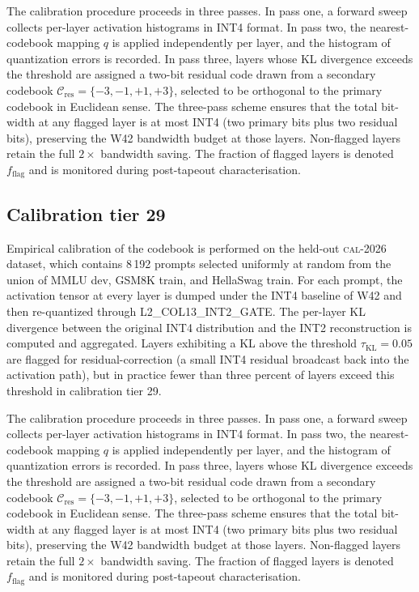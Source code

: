 The calibration procedure proceeds in three passes. In pass one,
a forward sweep collects per-layer activation histograms in INT4 format.
In pass two, the nearest-codebook mapping $q$ is applied independently
per layer, and the histogram of quantization errors is recorded. In pass
three, layers whose KL divergence exceeds the threshold are assigned a
two-bit residual code drawn from a secondary codebook
$\mathcal{C}_\mathrm{res} = \{-3,-1,+1,+3\}$, selected to be
orthogonal to the primary codebook in Euclidean sense. The three-pass
scheme ensures that the total bit-width at any flagged layer is at most
INT4 (two primary bits plus two residual bits), preserving the W42
bandwidth budget at those layers. Non-flagged layers retain the full
$2\times$ bandwidth saving. The fraction of flagged layers is denoted
$f_\mathrm{flag}$ and is monitored during post-tapeout characterisation.


\subsection{Calibration tier 29}

Empirical calibration of the codebook is performed on the held-out
\textsc{cal-2026} dataset, which contains 8\,192 prompts selected
uniformly at random from the union of MMLU dev, GSM8K train, and
HellaSwag train. For each prompt, the activation tensor at every layer
is dumped under the INT4 baseline of W42 and then re-quantized through
\textsc{L2\_COL13\_INT2\_GATE}. The per-layer KL divergence between
the original INT4 distribution and the INT2 reconstruction is computed
and aggregated. Layers exhibiting a KL above the threshold
$\tau_{\mathrm{KL}} = 0.05$ are flagged for residual-correction (a
small INT4 residual broadcast back into the activation path), but in
practice fewer than three percent of layers exceed this threshold in
calibration tier 29.

The calibration procedure proceeds in three passes. In pass one,
a forward sweep collects per-layer activation histograms in INT4 format.
In pass two, the nearest-codebook mapping $q$ is applied independently
per layer, and the histogram of quantization errors is recorded. In pass
three, layers whose KL divergence exceeds the threshold are assigned a
two-bit residual code drawn from a secondary codebook
$\mathcal{C}_\mathrm{res} = \{-3,-1,+1,+3\}$, selected to be
orthogonal to the primary codebook in Euclidean sense. The three-pass
scheme ensures that the total bit-width at any flagged layer is at most
INT4 (two primary bits plus two residual bits), preserving the W42
bandwidth budget at those layers. Non-flagged layers retain the full
$2\times$ bandwidth saving. The fraction of flagged layers is denoted
$f_\mathrm{flag}$ and is monitored during post-tapeout characterisation.


